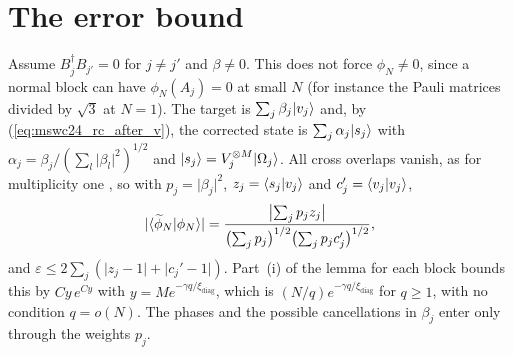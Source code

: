 \documentclass{article}
\begin{document}
\section{The error bound}
Assume $B_j^\dagger B_{j'}=0$ for $j\neq j'$ and $\beta\neq0$. This does not
force $\phi_N\neq0$, since a normal block can have $\phi_N(A_j)=0$ at small $N$
(for instance the Pauli matrices divided by $\sqrt3$ at $N=1$). The target is $\sum_j\beta_j|v_j\rangle$ and, by
(\ref{eq:mswc24_rc_after_v}), the corrected state is $\sum_j\alpha_j|s_j\rangle$ with
$\alpha_j=\beta_j/(\sum_l\lvert\beta_l\rvert^2)^{1/2}$ and
$|s_j\rangle=V_j^{\otimes M}|\Omega_j\rangle$. All cross overlaps vanish, as for
multiplicity one \cite{gap:mswc24_block_form_mixed_overlap}, so with
$p_j=\lvert\beta_j\rvert^2$, $z_j=\langle s_j | v_j \rangle$ and $c_j'=\langle v_j | v_j \rangle$,
\begin{align*}
    \lvert\langle \widetilde\phi_N | \phi_N \rangle\rvert
    =\frac{\bigl\lvert\sum_jp_jz_j\bigr\rvert}
    {\bigl(\sum_jp_j\bigr)^{1/2}\bigl(\sum_jp_jc_j'\bigr)^{1/2}},
\end{align*}
and $\varepsilon\leq2\sum_j(\lvert z_j-1\rvert+\lvert c_j'-1\rvert)$. Part~(i) of the
lemma for each block bounds this by $Cy\,e^{Cy}$ with
$y=Me^{-\gamma q/\xi_{\mathrm{diag}}}$, which is $(N/q)e^{-\gamma q/\xi_{\mathrm{diag}}}$
for $q\geq1$, with no condition $q=o(N)$. The phases
and the possible cancellations in $\beta_j$ enter only through the weights $p_j$.
\end{document}

